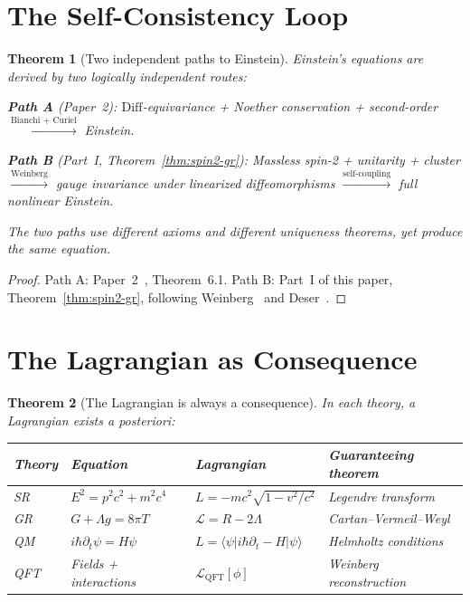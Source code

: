 \documentclass[12pt]{article}
\theoremstyle{plain}
\newtheorem{theorem}{Theorem}[section]
\theoremstyle{definition}
\theoremstyle{remark}
\newcommand{\Diff}{\mathrm{Diff}}
\begin{document}
\section{The Self-Consistency Loop}
\label{sec:loop}

\begin{theorem}[Two independent paths to Einstein]\label{thm:loop}
Einstein's equations are derived by two logically independent routes:

\textbf{Path A} (Paper~2): $\Diff$-equivariance + Noether conservation + second-order $\xrightarrow{\text{Bianchi + Curiel}}$ Einstein.

\textbf{Path B} (Part~I, Theorem~\ref{thm:spin2-gr}): Massless spin-2 + unitarity + cluster $\xrightarrow{\text{Weinberg}}$ gauge invariance under linearized diffeomorphisms $\xrightarrow{\text{self-coupling}}$ full nonlinear Einstein.

The two paths use different axioms and different uniqueness theorems, yet produce the same equation.
\end{theorem}

\begin{proof}
Path A: Paper~2~\cite{nembe2026p2}, Theorem~6.1. Path B: Part~I of this paper, Theorem~\ref{thm:spin2-gr}, following Weinberg~\cite{weinberg1964b,weinberg1965} and Deser~\cite{deser1970}.
\end{proof}


\section{The Lagrangian as Consequence}
\label{sec:lagrangian}

\begin{theorem}[The Lagrangian is always a consequence]\label{thm:lagrangian}
In each theory, a Lagrangian exists \emph{a posteriori}:

\begin{center}\small
\begin{tabular}{llll}\toprule
\textbf{Theory} & \textbf{Equation} & \textbf{Lagrangian} & \textbf{Guaranteeing theorem} \\\midrule
SR & $E^2 = p^2c^2 + m^2c^4$ & $L = -mc^2\sqrt{1 - v^2/c^2}$ & Legendre transform \\
GR & $G + \Lambda g = 8\pi T$ & $\mathcal{L} = R - 2\Lambda$ & Cartan--Vermeil--Weyl \\
QM & $i\hbar\partial_t\psi = H\psi$ & $L = \langle\psi|i\hbar\partial_t - H|\psi\rangle$ & Helmholtz conditions \\
QFT & Fields + interactions & $\mathcal{L}_{\mathrm{QFT}}[\phi]$ & Weinberg reconstruction \\
\bottomrule
\end{tabular}
\end{center}
\end{theorem}
\end{document}
